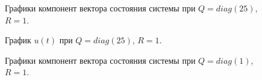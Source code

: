 \begin{figure}[!h]
	\caption{Графики компонент вектора состояния системы при $Q=diag(25)$, $R=1$.}
	\label{6_2_Q_25_R_1_x}
\end{figure}

\begin{figure}[!h]
	\caption{График $u(t)$ при $Q=diag(25)$, $R=1$.}
	\label{6_2_Q_25_R_1_u}
\end{figure}


\begin{figure}[!h]
	\caption{Графики компонент вектора состояния системы при $Q=diag(1)$, $R=1$.}
	\label{6_2_Q_1_R_1_x}
\end{figure}

